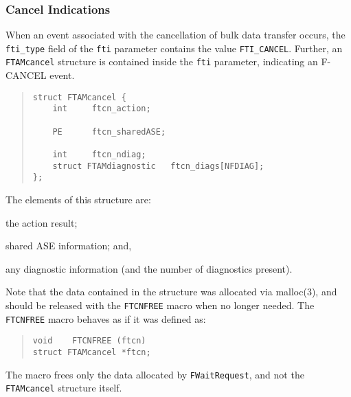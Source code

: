 \subsubsection	{Cancel Indications}
When an event associated with the cancellation of bulk data transfer occurs,
the \verb"fti_type" field of the \verb"fti" parameter contains the value
\verb"FTI_CANCEL".
Further,
an \verb"FTAMcancel" structure is contained inside the \verb"fti" parameter,
indicating an {\sf F-CANCEL\/} event.
\begin{quote}\small\begin{verbatim}
struct FTAMcancel {
    int     ftcn_action;

    PE      ftcn_sharedASE;

    int     ftcn_ndiag;
    struct FTAMdiagnostic   ftcn_diags[NFDIAG];
};
\end{verbatim}\end{quote}
The elements of this structure are:
\begin{describe}
\item[\verb"ftcn\_action":] the action result;

\item[\verb"ftcn\_sharedASE":] shared ASE information;
and,

\item[\verb"ftcn\_diags"/\verb"ftcn\_ndiag":] any diagnostic information
(and the number of diagnostics present).
\end{describe}
Note that the data contained in the structure was allocated via \man malloc(3),
and should be released with the \verb"FTCNFREE" macro when no longer needed.
The \verb"FTCNFREE" macro
behaves as if it was defined as:
\begin{quote}\small\begin{verbatim}
void    FTCNFREE (ftcn)
struct FTAMcancel *ftcn;
\end{verbatim}\end{quote}
The macro frees only the data allocated by \verb"FWaitRequest",
and not the \verb"FTAMcancel" structure itself.

